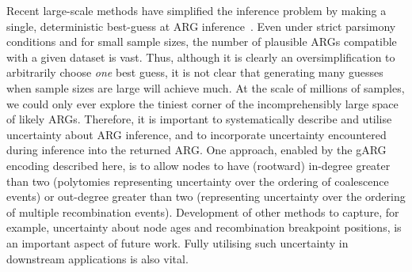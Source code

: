 \documentclass{article}
\begin{document}
Recent large-scale methods have simplified the inference problem by
making a single, deterministic best-guess at ARG
inference~\citep{kelleher2019inferring,speidel2019method,zhan2023towards}.
Even under strict parsimony conditions and for small sample sizes, the
number of plausible ARGs compatible with a given dataset is vast.
Thus, although it is clearly an oversimplification to arbitrarily
choose \emph{one} best guess,
it is not clear that generating many guesses
when sample sizes are large will achieve much.
At the scale of millions of samples,
we could only ever explore the tiniest corner of the incomprehensibly
large space of likely ARGs.
Therefore, it is important to systematically
describe and utilise uncertainty about ARG inference, and to
incorporate uncertainty encountered during inference into the returned ARG.
One approach, enabled by the gARG encoding described here, is to allow
nodes to have (rootward) in-degree greater than two (polytomies
representing uncertainty over the ordering of coalescence events) or
out-degree greater than two (representing uncertainty over the ordering
of multiple recombination events). Development of other methods to capture, for example,
uncertainty about node ages and recombination breakpoint positions, is an important
aspect of future work.
Fully utilising such uncertainty in downstream
applications is also vital.
\end{document}
